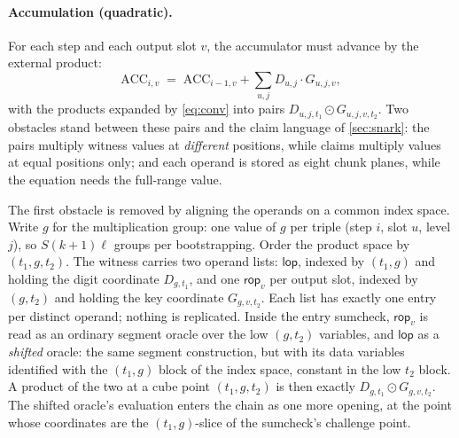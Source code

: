 \documentclass[11pt]{article}
\newcommand{\ACC}{\mathrm{ACC}}
\newcommand{\lop}{\mathsf{lop}}
\newcommand{\rop}{\mathsf{rop}}
\begin{document}
\paragraph{Accumulation (quadratic).} For each step and each output slot $v$, the accumulator must advance by the external product:
\[
  \ACC_{i,v} \;=\; \ACC_{i-1,v} + \sum_{u,j} D_{u,j} \cdot G_{u,j,v},
\]
with the products expanded by \eqref{eq:conv} into pairs $D_{u,j,t_1} \odot G_{u,j,v,t_2}$. Two obstacles stand between these pairs and the claim language of \cref{sec:snark}: the pairs multiply witness values at \emph{different} positions, while claims multiply values at equal positions only; and each operand is stored as eight chunk planes, while the equation needs the full-range value.

The first obstacle is removed by aligning the operands on a common index space. Write $g$ for the multiplication group: one value of $g$ per triple (step $i$, slot $u$, level $j$), so $S(k+1)\ell$ groups per bootstrapping. Order the product space by $(t_1, g, t_2)$. The witness carries two operand lists: $\lop$, indexed by $(t_1, g)$ and holding the digit coordinate $D_{g, t_1}$, and one $\rop_v$ per output slot, indexed by $(g, t_2)$ and holding the key coordinate $G_{g, v, t_2}$. Each list has exactly one entry per distinct operand; nothing is replicated. Inside the entry sumcheck, $\rop_v$ is read as an ordinary segment oracle over the low $(g, t_2)$ variables, and $\lop$ as a \emph{shifted} oracle: the same segment construction, but with its data variables identified with the $(t_1, g)$ block of the index space, constant in the low $t_2$ block. A product of the two at a cube point $(t_1, g, t_2)$ is then exactly $D_{g,t_1} \odot G_{g,v,t_2}$. The shifted oracle's evaluation enters the chain as one more opening, at the point whose coordinates are the $(t_1, g)$-slice of the sumcheck's challenge point.
\end{document}
